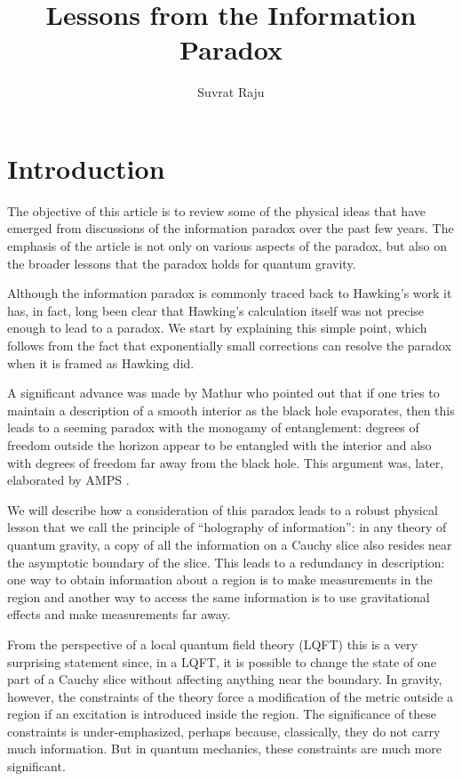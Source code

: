 \documentclass[12pt]{article}
\title{Lessons from the Information Paradox}
\author{Suvrat Raju}
\affiliation{International Centre for Theoretical Sciences, Tata Institute of Fundamental Research, Shivakote, Bengaluru 560089, India.}
\date{}
\begin{document}
\maketitle
\section{Introduction}
The objective of this article is to review some of the physical ideas that have emerged from discussions of the information paradox over the past few years. The emphasis of the article is not only on various aspects of the
paradox, but also on the broader lessons that the paradox holds for quantum gravity.

Although the information paradox is commonly traced back to Hawking's work \cite{Hawking:1976ra,Hawking:1974sw}  it has, in fact, long been clear that Hawking's calculation itself was not precise enough to lead to a paradox. We start by explaining this simple point, which follows from the fact that  exponentially small corrections can resolve the paradox when it is framed as Hawking did.

A significant advance was made by Mathur \cite{Mathur:2009hf} who pointed out that if one tries to maintain a description of a smooth interior as the black hole evaporates, then this leads to a seeming paradox with the monogamy of entanglement: degrees of freedom outside the horizon appear to be entangled with the interior and also with degrees of freedom far away from the black hole. This argument was, later, elaborated by AMPS  \cite{Almheiri:2012rt}.



We will describe how a consideration of this paradox leads to a robust physical lesson that we call the principle of ``holography of information'': in any theory of quantum gravity, a copy of all the information on a Cauchy slice also resides near the asymptotic boundary of the slice. This leads to a redundancy in description: one way to obtain information about a region is to make measurements in the region and another way to access the same information is to use gravitational effects and make measurements far away.




From the perspective of a local quantum field theory (LQFT) this is a very surprising statement since, in a LQFT, it is possible to change the state of one part of a Cauchy slice without affecting anything near the boundary. In gravity, however, the constraints of the theory force a modification of the metric outside a region if an excitation is introduced inside the region. The significance of these constraints is under-emphasized, perhaps because, classically, they do not carry much information. But in quantum mechanics, these constraints are much more significant.
\end{document}
